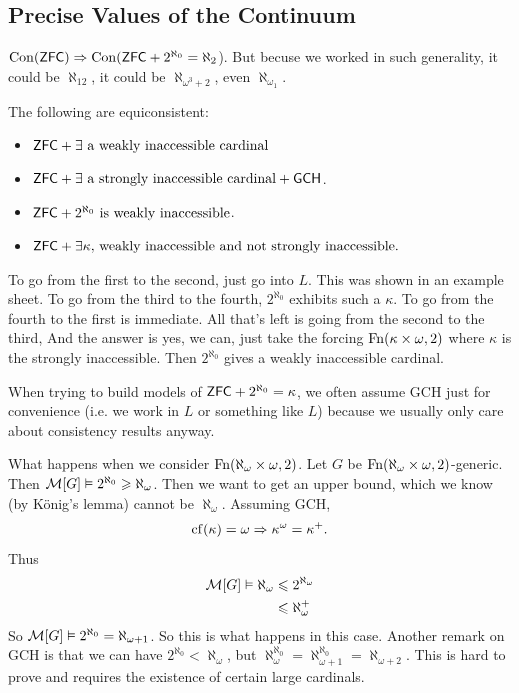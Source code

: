\documentclass{article}
\begin{document}
    \subsection{Precise Values of the Continuum}
    \begin{corr}{}
        $\operatorname{Con}(\mathsf{ZFC}) \Rightarrow \operatorname{Con}(\mathsf{ZFC} + 2^{\aleph_{0}}=\aleph_{2}$). But becuse we worked in such generality, it could be $\aleph_{12}$, it could be $\aleph_{\omega^{3}+2}$, even $\aleph_{\omega_{1}}$.
    \end{corr}
    \begin{corr}{}
        The following are equiconsistent: \begin{itemize}
            \item $\mathsf{ZFC} + \exists \text{ a weakly inaccessible cardinal}$
            \item $\mathsf{ZFC} + \exists \text{ a strongly inaccessible cardinal} + \mathsf{GCH}$.
            \item $\mathsf{ZFC} + 2^{\aleph_{0}} \text{ is weakly inaccessible}$.
            \item $\mathsf{ZFC} + \exists \kappa, \, \text{weakly inaccessible and not strongly inaccessible.}$
        \end{itemize}
    \end{corr}
    \proof To go from the first to the second, just go into $L$. This was shown in an example sheet. To go from the third to the fourth, $2^{\aleph_{0}}$ exhibits such a $\kappa$. To go from the fourth to the first is immediate. All that's left is going from the second to the third,  And the answer is yes, we can, just take the forcing $\operatorname{Fn}(\kappa \times \omega,2)$ where $\kappa$ is the strongly inaccessible. Then $2^{\aleph_{0}}$ gives a weakly inaccessible cardinal. \endproof
    \begin{remark*}
        When trying to build models of $\mathsf{ZFC} + 2^{\aleph_{0}} = \kappa$, we often assume GCH just for convenience (i.e. we work in $L$ or something like $L$) because we usually only care about consistency results anyway.
    \end{remark*}
    \begin{ex*}
        What happens when we consider $\operatorname{Fn}(\aleph_{\omega} \times \omega, 2)$. Let $G$ be $\operatorname{Fn}(\aleph_{\omega} \times \omega, 2)$-generic. Then $\mathcal{M}[G] \vDash 2^{\aleph_{0}} \geqslant \aleph_{\omega}$. Then we want to get an upper bound, which we know (by K\"onig's lemma) cannot be $\aleph_{\omega}$. Assuming GCH, \[ \operatorname{cf}(\kappa) = \omega \Rightarrow \kappa^{\omega} = \kappa^{+}.\]
        Thus \begin{align*}
            \mathcal{M}[G] \vDash \aleph_{\omega} & \leqslant 2^{\aleph_{\omega}} \\
                                             & \leqslant \aleph_{\omega}^{+}
        \end{align*}
        So $\mathcal{M}[G] \vDash 2^{\aleph_{0}} = \aleph_{\omega+1}$. So this is what happens in this case.\gap
        Another remark on GCH is that we can have $2^{\aleph_{0}} < \aleph_{\omega}$, but $\aleph_{\omega}^{\aleph_{0}} = \aleph_{\omega+1}^{\aleph_{0}}= \aleph_{\omega+2}$. This is hard to prove and requires the existence of certain large cardinals.
    \end{ex*}
\end{document}

